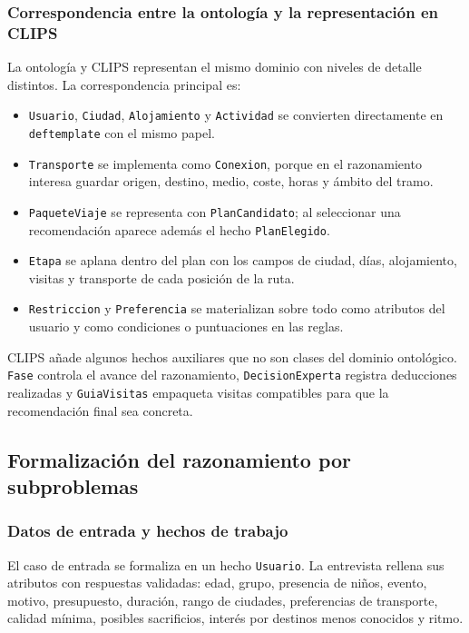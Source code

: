 \documentclass[11pt,a4paper]{article}
\begin{document}
\subsubsection{Correspondencia entre la ontolog\'ia y la representaci\'on en CLIPS}
La ontolog\'ia y CLIPS representan el mismo dominio con niveles de detalle
distintos. La correspondencia principal es:
\begin{itemize}
    \item \texttt{Usuario}, \texttt{Ciudad}, \texttt{Alojamiento} y
    \texttt{Actividad} se convierten directamente en \texttt{deftemplate} con
    el mismo papel.
    \item \texttt{Transporte} se implementa como \texttt{Conexion}, porque en
    el razonamiento interesa guardar origen, destino, medio, coste, horas y
    \'ambito del tramo.
    \item \texttt{PaqueteViaje} se representa con \texttt{PlanCandidato}; al
    seleccionar una recomendaci\'on aparece adem\'as el hecho
    \texttt{PlanElegido}.
    \item \texttt{Etapa} se aplana dentro del plan con los campos de ciudad,
    d\'ias, alojamiento, visitas y transporte de cada posici\'on de la ruta.
    \item \texttt{Restriccion} y \texttt{Preferencia} se materializan sobre
    todo como atributos del usuario y como condiciones o puntuaciones en las
    reglas.
\end{itemize}

CLIPS a\~nade algunos hechos auxiliares que no son clases del dominio
ontol\'ogico. \texttt{Fase} controla el avance del razonamiento,
\texttt{DecisionExperta} registra deducciones realizadas y
\texttt{GuiaVisitas} empaqueta visitas compatibles para que la recomendaci\'on
final sea concreta.

\subsection{Formalizaci\'on del razonamiento por subproblemas}
\subsubsection{Datos de entrada y hechos de trabajo}
El caso de entrada se formaliza en un hecho \texttt{Usuario}. La entrevista
rellena sus atributos con respuestas validadas: edad, grupo, presencia de
ni\~nos, evento, motivo, presupuesto, duraci\'on, rango de ciudades,
preferencias de transporte, calidad m\'inima, posibles sacrificios, inter\'es
por destinos menos conocidos y ritmo.
\end{document}
